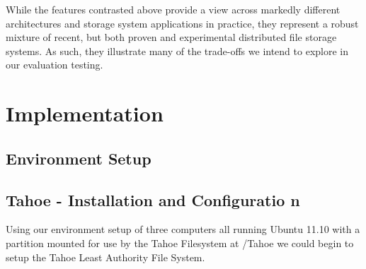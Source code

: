 \documentclass[11pt]{article}
\begin{document}
While the features contrasted above provide a view across markedly different 
architectures and storage system applications in practice, they represent a 
robust mixture of recent, but both proven and experimental distributed file 
storage systems. As such, they illustrate many of the trade-offs we intend 
to explore in our evaluation testing.


\section{Implementation}

\subsection{Environment Setup}


\subsection{Tahoe - Installation and Configuratio n}
Using our environment setup of three computers all running Ubuntu 11.10 with a partition mounted for use by the Tahoe Filesystem at /Tahoe we could begin to setup the Tahoe Least Authority File System. 
\end{document}
